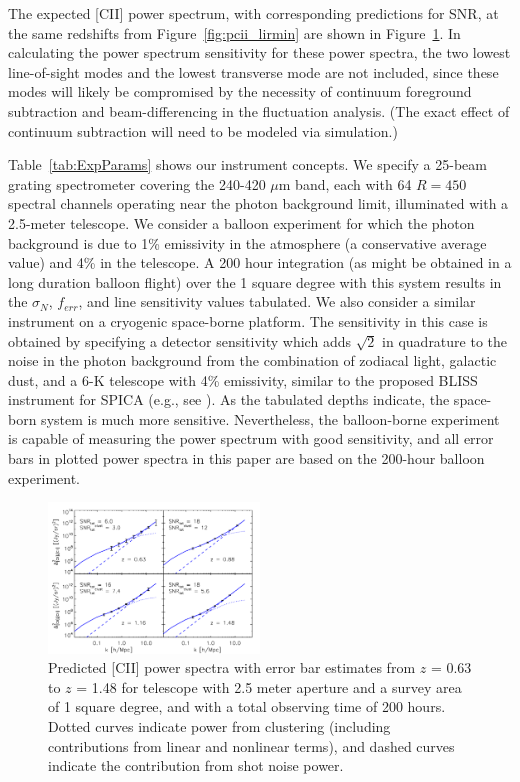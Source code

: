 \documentclass[iop]{emulateapj}
\begin{document}
The expected [CII] power spectrum, with corresponding predictions for SNR, at the same redshifts from Figure~\ref{fig:pcii_lirmin} are shown in Figure~\ref{fig:pcii_zall}. In calculating the power spectrum sensitivity for these power spectra, the two lowest line-of-sight modes and the lowest transverse mode are not included, since these modes will likely be compromised by the necessity of continuum foreground subtraction and beam-differencing in the fluctuation analysis. (The exact effect of continuum subtraction will need to be modeled via simulation.)

Table~\ref{tab:ExpParams} shows our instrument concepts.  We specify a 25-beam grating spectrometer covering the 240-420 $\mu$m band, each with 64 $R=450$ spectral channels operating near the photon background limit, illuminated with a 2.5-meter telescope. We consider a balloon experiment for which the photon background is due to 1\% emissivity in the atmosphere (a conservative average value) and 4\% in the telescope. A 200 hour integration (as might be obtained in a long duration balloon flight) over the 1 square degree with this system results in the $\sigma_N$, $f_{err}$, and line sensitivity values tabulated. We also consider a similar instrument on a cryogenic space-borne platform. The sensitivity in this case is obtained by specifying a detector sensitivity which adds $\sqrt{2}$ in quadrature to the noise in the photon background from the combination of zodiacal light, galactic dust, and a 6-K telescope with 4\% emissivity, similar to the proposed BLISS instrument for SPICA (e.g., see \citet{bradford12}). As the tabulated depths indicate, the space-born system is much more sensitive. Nevertheless, the balloon-borne experiment is capable of measuring the power spectrum with good sensitivity, and all error bars in plotted power spectra in this paper are based on the 200-hour balloon experiment. 

\begin{figure}[b]
\centering
\includegraphics[width = 0.5\textwidth]{pcii_STARFIRE_z63_z88_z116_z148_halofit_bethermin_spinoglio_ap2p5m_1sqdeg_uhp_ktnonzero_minimaltext}
\caption{Predicted [CII] power spectra with error bar estimates from $z$ = 0.63 to $z$ = 1.48 for telescope with 2.5 meter aperture and a survey area of 1 square degree, and with a total observing time of 200 hours. Dotted curves indicate power from clustering (including contributions from linear and nonlinear terms), and dashed curves indicate the contribution from shot noise power.}
\label{fig:pcii_zall}
\end{figure}
\end{document}
